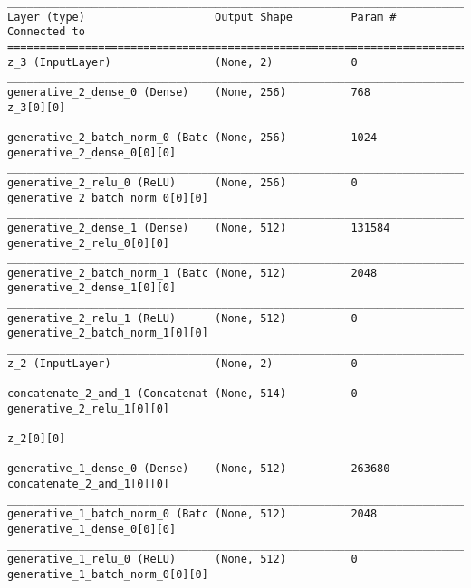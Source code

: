 \begin{lstlisting}[caption={CelebA-VLAE-GAN Decoder},captionpos=b,basicstyle=\tiny, label={lst:mnist-vlae-gan-decoder}]
__________________________________________________________________________________________________
Layer (type)                    Output Shape         Param #     Connected to
==================================================================================================
z_3 (InputLayer)                (None, 2)            0
__________________________________________________________________________________________________
generative_2_dense_0 (Dense)    (None, 256)          768         z_3[0][0]
__________________________________________________________________________________________________
generative_2_batch_norm_0 (Batc (None, 256)          1024        generative_2_dense_0[0][0]
__________________________________________________________________________________________________
generative_2_relu_0 (ReLU)      (None, 256)          0           generative_2_batch_norm_0[0][0]
__________________________________________________________________________________________________
generative_2_dense_1 (Dense)    (None, 512)          131584      generative_2_relu_0[0][0]
__________________________________________________________________________________________________
generative_2_batch_norm_1 (Batc (None, 512)          2048        generative_2_dense_1[0][0]
__________________________________________________________________________________________________
generative_2_relu_1 (ReLU)      (None, 512)          0           generative_2_batch_norm_1[0][0]
__________________________________________________________________________________________________
z_2 (InputLayer)                (None, 2)            0
__________________________________________________________________________________________________
concatenate_2_and_1 (Concatenat (None, 514)          0           generative_2_relu_1[0][0]
                                                                 z_2[0][0]
__________________________________________________________________________________________________
generative_1_dense_0 (Dense)    (None, 512)          263680      concatenate_2_and_1[0][0]
__________________________________________________________________________________________________
generative_1_batch_norm_0 (Batc (None, 512)          2048        generative_1_dense_0[0][0]
__________________________________________________________________________________________________
generative_1_relu_0 (ReLU)      (None, 512)          0           generative_1_batch_norm_0[0][0]

\end{lstlisting}
